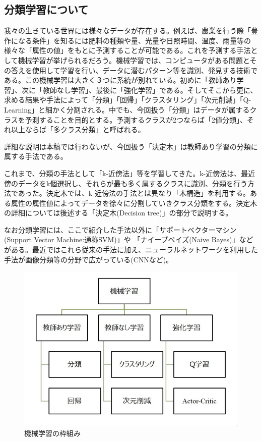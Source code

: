 \documentclass[dvipdfmx]{jsarticle}
\begin{document}
\subsection{分類学習について}
我々の生きている世界には様々なデータが存在する。例えば、農業を行う際「豊作になる条件」を知るには肥料の種類や量、光量や日照時間、温度、雨量等の様々な「属性の値」をもとに予測することが可能である。これを予測する手法として機械学習が挙げられるだろう。機械学習では、コンピュータがある問題とその答えを使用して学習を行い、データに潜むパターン等を識別、発見する技術である。この機械学習は大きく３つに系統が別れている。初めに「教師あり学習」、次に「教師なし学習」、最後に「強化学習」である。そしてそこから更に、求める結果や手法によって「分類」「回帰」「クラスタリング」「次元削減」「Q-Learning」と細かく分割される。中でも、今回扱う「分類」はデータが属するクラスを予測することを目的とする。予測するクラスが2つならば「2値分類」、それ以上ならば「多クラス分類」と呼ばれる。\par
詳細な説明は本稿では行わないが、今回扱う「決定木」は教師あり学習の分類に属する手法である。\par
これまで、分類の手法として「k-近傍法」等を学習してきた。k-近傍法は、最近傍のデータをk個選択し、それらが最も多く属するクラスに識別、分類を行う方法であった。決定木では、k-近傍法の手法とは異なり「木構造」を利用する。ある属性の属性値によってデータを徐々に分割していきクラス分類をする。決定木の詳細については後述する「決定木(Decision tree)」の部分で説明する。\par
なお分類学習には、ここで紹介した手法以外に「サポートベクターマシン(Support Vector Machine:通称SVM)」や 「ナイーブベイズ(Naive Bayes)」などがある。最近ではこれら従来の手法に加え、ニューラルネットワークを利用した手法が画像分類等の分野で広がっている(CNNなど)。
\begin{figure}[H]
  \centering
  \includegraphics[scale=0.6]{ML.PNG}
  \caption{機械学習の枠組み}
\end{figure}
\end{document}
